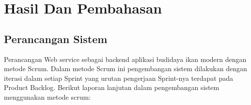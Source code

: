 
\chapter{Hasil Dan Pembahasan}

\section{Perancangan Sistem}
Perancangan Web service sebagai backend aplikasi budidaya ikan modern dengan metode Scrum. Dalam metode Scrum ini pengembangan sistem dilakukan dengan iterasi dalam setiap Sprint yang urutan pengerjaan Sprint-nya terdapat pada Product Backlog. Berikut laporan lanjutan dalam pengembangan sistem menggunakan metode scrum:

